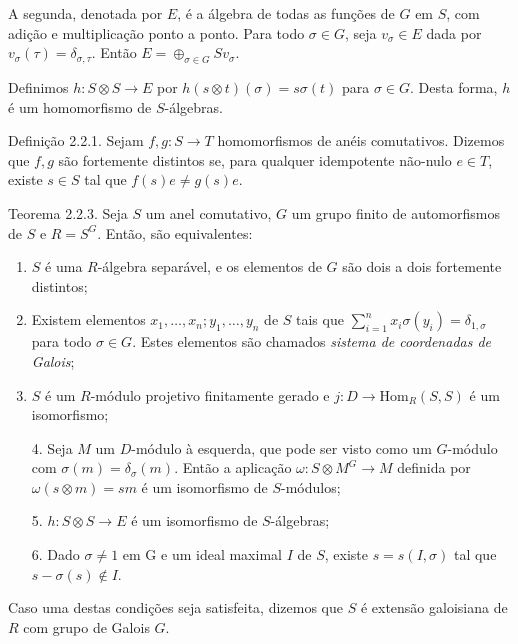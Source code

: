 \documentclass{beamer}
\begin{document}
\begin{frame}
    A segunda, denotada por $E$, é a álgebra de todas as funções de $G$ em $S$, com adição e multiplicação ponto a ponto. Para todo $\sigma \in G$, seja $v_\sigma \in E$ dada por $v_\sigma(\tau) = \delta_{\sigma, \tau}$. Então $E = \oplus_{\sigma \in G} S v_\sigma$.
    
    \vspace{18pt}
    
    Definimos $h: S\otimes S \rightarrow E$ por $h(s\otimes t)(\sigma) = s\sigma(t)$ para $\sigma \in G$. Desta forma, $h$ é um homomorfismo de $S$-álgebras.
\end{frame}

\begin{frame}{Definição 2.2.1.}
    Sejam $f, g: S \rightarrow T$ homomorfismos de anéis comutativos. Dizemos que $f, g$ são fortemente distintos se, para qualquer idempotente não-nulo $e \in T$, existe $s \in S$ tal que $f(s)e \neq g(s)e$.
\end{frame}

\begin{frame}{Teorema 2.2.3.}
    Seja $S$ um anel comutativo, $G$ um grupo finito de automorfismos de $S$ e $R=S^G$. Então, são equivalentes:
    \begin{enumerate}
        \item $S$ é uma $R$-álgebra separável, e os elementos de $G$ são dois a dois fortemente distintos;
        \item Existem elementos $x_1,\dots,x_n;y_1,\dots,y_n$ de $S$ tais que $\sum_{i=1}^{n}x_i\sigma(y_i)=\delta_{1,\sigma}$ para todo $\sigma \in G$. Estes elementos são chamados \emph{sistema de coordenadas de Galois};
        \item $S$ é um $R$-módulo projetivo finitamente gerado e $j: D \rightarrow \text{Hom}_{R}(S,S)$ é um isomorfismo;
    \end{enumerate}
\end{frame}
\begin{frame}
    \begin{enumerate}
        \item[4.] Seja $M$ um $D$-módulo à esquerda, que pode ser visto como um $G$-módulo com $\sigma(m)=\delta_\sigma(m)$. Então a aplicação $\omega: S\otimes M^G \rightarrow M$ definida por $\omega(s\otimes m)=sm$ é um isomorfismo de $S$-módulos;
        \item[5.] $h: S\otimes S \rightarrow E$ é um isomorfismo de $S$-álgebras;
        \item[6.] Dado $\sigma \neq 1$ em G e um ideal maximal $I$ de $S$, existe $s=s(I,\sigma)$ tal que $s-\sigma(s)\not\in I$.
    \end{enumerate}
    
    \vspace{18pt}
    
    Caso uma destas condições seja satisfeita, dizemos que $S$ é extensão galoisiana de $R$ com grupo de Galois $G$.
\end{frame}
\end{document}
